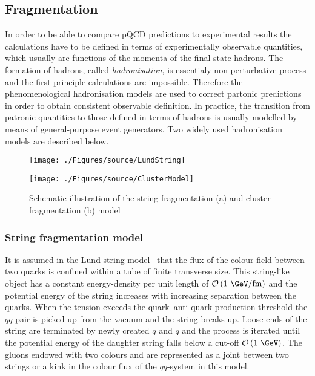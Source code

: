 \subsection{Fragmentation}
\label{subsec:fragmentation}
In order to be able to compare pQCD predictions to experimental results the calculations have to be defined in terms of experimentally observable quantities, which usually are functions of the momenta of the final-state hadrons. The formation of hadrons, called \emph{hadronisation}, is essentialy non-perturbative process and the first-principle calculations are impossible. Therefore the phenomenological hadronisation models are used to correct partonic predictions in order to obtain consistent observable definition. In practice, the transition from patronic quantities to those defined in terms of hadrons is usually modelled by means of general-purpose event generators. Two widely used hadronisation models are described below.
\begin{figure}[t]
	\centering
	\begin{subfloat}[]{
		\texttt{[image: ./Figures/source/LundString]}
		\label{fig:lund}
	 }%
	\end{subfloat}
	\begin{subfloat}[]{
		\texttt{[image: ./Figures/source/ClusterModel]}
		\label{fig:cluster}
	}%
	\end{subfloat}
	\caption{Schematic illustration of the string fragmentation (a) and cluster fragmentation (b) model}
\label{fig:fragmentationmodels}
\end{figure}
\subsubsection{String fragmentation model}
It is assumed in the Lund string model~\cite{lundmodel} that the flux of the colour field between two quarks is confined within a tube of finite transverse size. This string-like object has a constant energy-density per unit length of $\mathcal{O}\left( \text{1 \GeV/fm}\right)$ and the potential energy of the string increases with increasing separation between the quarks. When the tension exceeds the quark--anti-quark production threshold the $q\bar{q}$-pair is picked up from the vacuum and the string breaks up. Loose ends of the string are terminated by newly created $q$ and $\bar{q}$ and the process is iterated until the potential energy of the daughter string falls below a cut-off $\mathcal{O}\left( \text{1 \GeV}\right)$. The gluons endowed with two colours and are represented as a joint between two strings or a kink in the colour flux of the $q\bar{q}$-system in this model. 

